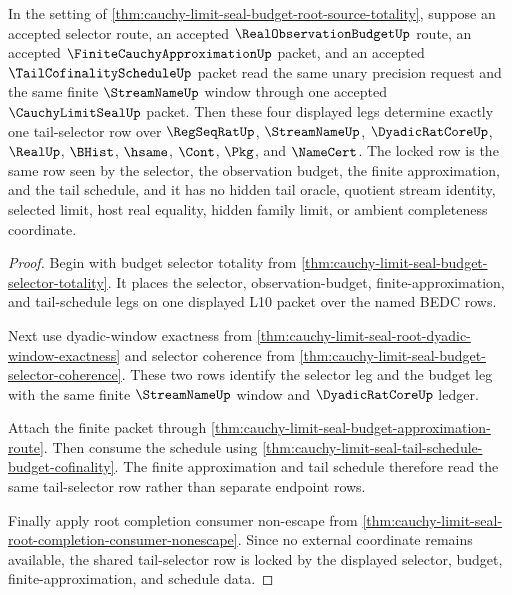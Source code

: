 \begin{theorem}
\label{thm:cauchy-limit-seal-budget-tail-selector-lock}
In the setting of \autoref{thm:cauchy-limit-seal-budget-root-source-totality}, suppose an accepted selector route, an accepted $\RealObservationBudgetUp$ route, an accepted $\FiniteCauchyApproximationUp$ packet, and an accepted $\TailCofinalityScheduleUp$ packet read the same unary precision request and the same finite $\StreamNameUp$ window through one accepted $\CauchyLimitSealUp$ packet. Then these four displayed legs determine exactly one tail-selector row over $\RegSeqRatUp$, $\StreamNameUp$, $\DyadicRatCoreUp$, $\RealUp$, $\BHist$, $\hsame$, $\Cont$, $\Pkg$, and $\NameCert$. The locked row is the same row seen by the selector, the observation budget, the finite approximation, and the tail schedule, and it has no hidden tail oracle, quotient stream identity, selected limit, host real equality, hidden family limit, or ambient completeness coordinate.
\end{theorem}
\begin{proof}
Begin with budget selector totality from \autoref{thm:cauchy-limit-seal-budget-selector-totality}. It places the selector, observation-budget, finite-approximation, and tail-schedule legs on one displayed L10 packet over the named BEDC rows.

Next use dyadic-window exactness from \autoref{thm:cauchy-limit-seal-root-dyadic-window-exactness} and selector coherence from \autoref{thm:cauchy-limit-seal-budget-selector-coherence}. These two rows identify the selector leg and the budget leg with the same finite $\StreamNameUp$ window and $\DyadicRatCoreUp$ ledger.

Attach the finite packet through \autoref{thm:cauchy-limit-seal-budget-approximation-route}. Then consume the schedule using \autoref{thm:cauchy-limit-seal-tail-schedule-budget-cofinality}. The finite approximation and tail schedule therefore read the same tail-selector row rather than separate endpoint rows.

Finally apply root completion consumer non-escape from \autoref{thm:cauchy-limit-seal-root-completion-consumer-nonescape}. Since no external coordinate remains available, the shared tail-selector row is locked by the displayed selector, budget, finite-approximation, and schedule data.
\end{proof}

